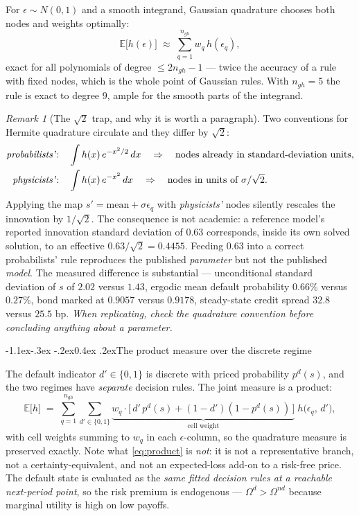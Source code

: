 \documentclass[10pt,a4paper]{article}
\makeatletter
\theoremstyle{definition}
\theoremstyle{plain}
\theoremstyle{remark}
\newtheorem{rem}[defn]{Remark}
\newcommand{\E}{\mathbb{E}}
\renewcommand\subsection{\@startsection{subsection}{2}{\z@}%
  {-1.1ex\@plus -.3ex \@minus -.2ex}{0.4ex \@plus .2ex}{\normalfont\normalsize\bfseries}}
\makeatother
\begin{document}
For $\epsilon\sim N(0,1)$ and a smooth integrand, Gaussian quadrature chooses both nodes and
weights optimally:
\begin{equation}
  \E\big[h(\epsilon)\big] \;\approx\; \sum_{q=1}^{n_{gh}} w_q\, h(\epsilon_q),
\end{equation}
exact for all polynomials of degree $\le 2n_{gh}-1$ --- twice the accuracy of a rule with
fixed nodes, which is the whole point of Gaussian rules. With $n_{gh}=5$ the rule is exact to
degree $9$, ample for the smooth parts of the integrand.

\begin{rem}[The $\sqrt2$ trap, and why it is worth a paragraph]
Two conventions for Hermite quadrature circulate and they differ by $\sqrt2$:
\begin{align}
  \text{\emph{probabilists'}:}&\quad \int h(x)\,e^{-x^2/2}\,dx \quad\Rightarrow\quad
  \text{nodes already in standard-deviation units,}\\
  \text{\emph{physicists'}:}&\quad \int h(x)\,e^{-x^2}\,dx \quad\Rightarrow\quad
  \text{nodes in units of } \sigma/\sqrt2 .
\end{align}
Applying the map $s' = \text{mean} + \sigma\epsilon_q$ with \emph{physicists'} nodes silently
rescales the innovation by $1/\sqrt2$. The consequence is not academic: a reference model's
reported innovation standard deviation of $0.63$ corresponds, inside its own solved solution,
to an effective $0.63/\sqrt2 = 0.4455$. Feeding $0.63$ into a correct probabilists' rule
reproduces the published \emph{parameter} but not the published \emph{model}. The measured
difference is substantial --- unconditional standard deviation of $s$ of $2.02$ versus
$1.43$, ergodic mean default probability $0.66\%$ versus $0.27\%$, bond marked at $0.9057$
versus $0.9178$, steady-state credit spread $32.8$ versus $25.5$ bp. \emph{When replicating,
check the quadrature convention before concluding anything about a parameter.}
\end{rem}

\subsection{The product measure over the discrete regime}

The default indicator $d'\in\{0,1\}$ is discrete with priced probability $p^d(s)$, and the two
regimes have \emph{separate} decision rules. The joint measure is a product:
\begin{equation}
  \E\big[h\big] \;=\; \sum_{q=1}^{n_{gh}} \sum_{d'\in\{0,1\}}
  \underbrace{w_q\cdot\big[\,d'\,p^d(s) + (1-d')(1-p^d(s))\,\big]}_{\text{cell weight}}\;
  h\big(\epsilon_q,\,d'\big),
  \label{eq:product}
\end{equation}
with cell weights summing to $w_q$ in each $\epsilon$-column, so the quadrature measure is
preserved exactly. Note what \eqref{eq:product} is \emph{not}: it is not a representative
branch, not a certainty-equivalent, and not an expected-loss add-on to a risk-free price. The
default state is evaluated as the \emph{same fitted decision rules at a reachable
next-period point}, so the risk premium is endogenous --- $\Omega^{d}>\Omega^{nd}$ because
marginal utility is high on low payoffs.
\end{document}
